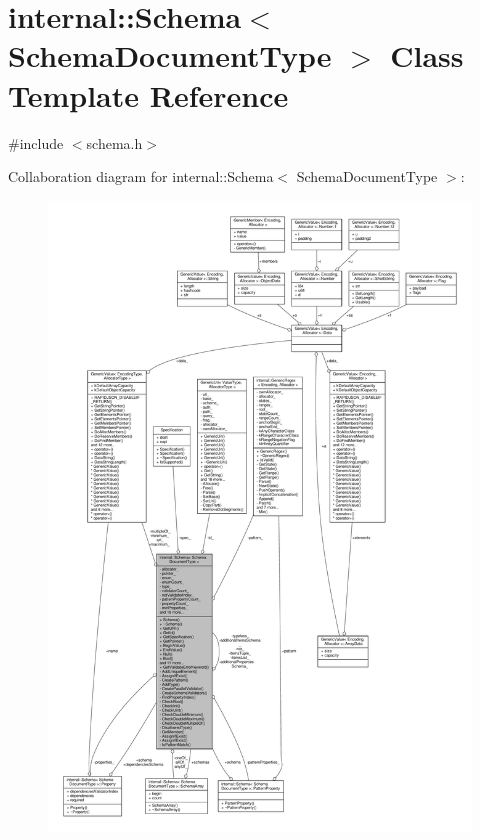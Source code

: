 \hypertarget{classinternal_1_1Schema}{}\section{internal\+:\+:Schema$<$ Schema\+Document\+Type $>$ Class Template Reference}
\label{classinternal_1_1Schema}


{\ttfamily \#include $<$schema.\+h$>$}



Collaboration diagram for internal\+:\+:Schema$<$ Schema\+Document\+Type $>$\+:
\nopagebreak
\begin{figure}[H]
\begin{center}
\leavevmode
\includegraphics[width=350pt]{classinternal_1_1Schema__coll__graph}
\end{center}
\end{figure}
